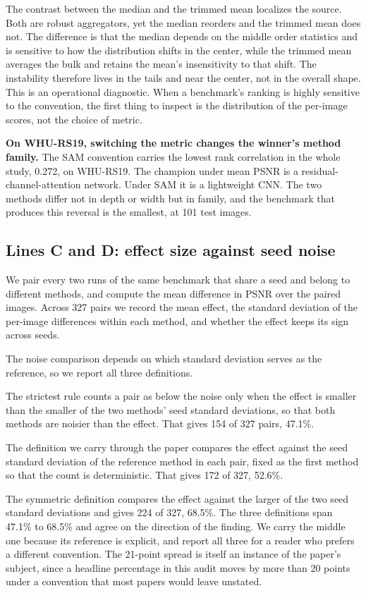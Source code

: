 \documentclass[journal,twoside,10pt]{IEEEtran}
\begin{document}
The contrast between the median and the trimmed mean localizes the source. Both are robust aggregators, yet the median reorders and the trimmed mean does not. The difference is that the median depends on the middle order statistics and is sensitive to how the distribution shifts in the center, while the trimmed mean averages the bulk and retains the mean's insensitivity to that shift. The instability therefore lives in the tails and near the center, not in the overall shape. This is an operational diagnostic. When a benchmark's ranking is highly sensitive to the convention, the first thing to inspect is the distribution of the per-image scores, not the choice of metric.

\textbf{On WHU-RS19, switching the metric changes the winner's method family.} The SAM convention carries the lowest rank correlation in the whole study, 0.272, on WHU-RS19. The champion under mean PSNR is a residual-channel-attention network. Under SAM it is a lightweight CNN. The two methods differ not in depth or width but in family, and the benchmark that produces this reversal is the smallest, at 101 test images.

\subsection{Lines C and D: effect size against seed noise}


We pair every two runs of the same benchmark that share a seed and belong to different methods, and compute the mean difference in PSNR over the paired images. Across 327 pairs we record the mean effect, the standard deviation of the per-image differences within each method, and whether the effect keeps its sign across seeds.

The noise comparison depends on which standard deviation serves as the reference, so we report all three definitions.

The strictest rule counts a pair as below the noise only when the effect is smaller than the smaller of the two methods' seed standard deviations, so that both methods are noisier than the effect. That gives 154 of 327 pairs, 47.1\%.

The definition we carry through the paper compares the effect against the seed standard deviation of the reference method in each pair, fixed as the first method so that the count is deterministic. That gives 172 of 327, 52.6\%.

The symmetric definition compares the effect against the larger of the two seed standard deviations and gives 224 of 327, 68.5\%. The three definitions span 47.1\% to 68.5\% and agree on the direction of the finding. We carry the middle one because its reference is explicit, and report all three for a reader who prefers a different convention. The 21-point spread is itself an instance of the paper's subject, since a headline percentage in this audit moves by more than 20 points under a convention that most papers would leave unstated.
\end{document}
